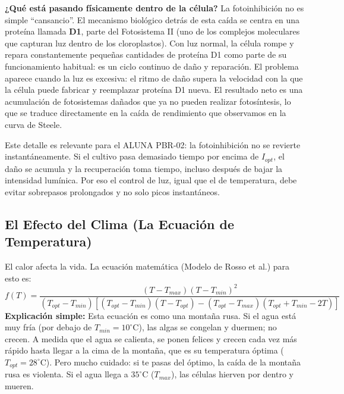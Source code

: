 \documentclass[11pt,a4paper]{article}
\begin{document}
\begin{center}
\end{center}

\textbf{¿Qué está pasando físicamente dentro de la célula?} La fotoinhibición no es simple ``cansancio''. El mecanismo biológico detrás de esta caída se centra en una proteína llamada \textbf{D1}, parte del Fotosistema II (uno de los complejos moleculares que capturan luz dentro de los cloroplastos). Con luz normal, la célula rompe y repara constantemente pequeñas cantidades de proteína D1 como parte de su funcionamiento habitual: es un ciclo continuo de daño y reparación. El problema aparece cuando la luz es excesiva: el ritmo de daño supera la velocidad con la que la célula puede fabricar y reemplazar proteína D1 nueva. El resultado neto es una acumulación de fotosistemas dañados que ya no pueden realizar fotosíntesis, lo que se traduce directamente en la caída de rendimiento que observamos en la curva de Steele.

Este detalle es relevante para el ALUNA PBR-02: la fotoinhibición no se revierte instantáneamente. Si el cultivo pasa demasiado tiempo por encima de $I_{opt}$, el daño se acumula y la recuperación toma tiempo, incluso después de bajar la intensidad lumínica. Por eso el control de luz, igual que el de temperatura, debe evitar sobrepasos prolongados y no solo picos instantáneos.

\subsection{El Efecto del Clima (La Ecuación de Temperatura)}
El calor afecta la vida. La ecuación matemática (Modelo de Rosso et al.) para esto es:
\begin{equation}
f(T) = \frac{(T-T_{max})(T-T_{min})^2}{(T_{opt}-T_{min}) \left[ (T_{opt}-T_{min})(T-T_{opt}) - (T_{opt}-T_{max})(T_{opt}+T_{min}-2T) \right]}
\end{equation}
\textbf{Explicación simple:} Esta ecuación es como una montaña rusa. Si el agua está muy fría (por debajo de $T_{min} = 10^\circ$C), las algas se congelan y duermen; no crecen. A medida que el agua se calienta, se ponen felices y crecen cada vez más rápido hasta llegar a la cima de la montaña, que es su temperatura óptima ($T_{opt} = 28^\circ$C). Pero mucho cuidado: si te pasas del óptimo, la caída de la montaña rusa es violenta. Si el agua llega a $35^\circ$C ($T_{max}$), las células hierven por dentro y mueren.
\end{document}
